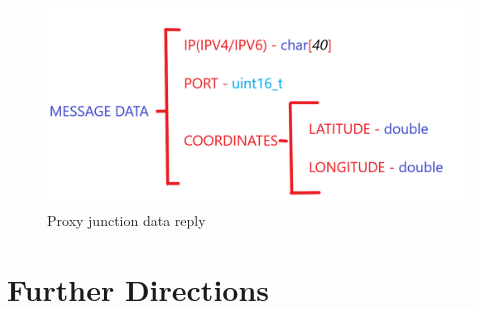 \documentclass[17pt]{report}
\begin{document}
\begin{figure}[h!]
    \includegraphics[width=\textwidth]{Sketches/ProxyJunctionMessage.png}
    \caption{Proxy junction data reply}
    \label{fig:Proxy junction data reply}
\end{figure}

\chapter{Further Directions}

\pagebreak
\printbibliography
\end{document}
